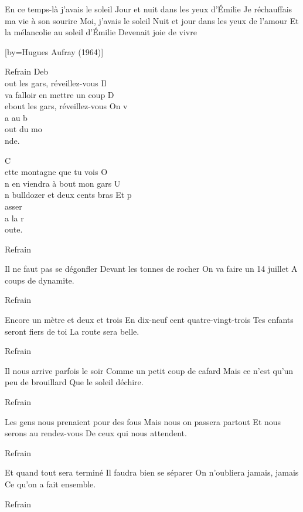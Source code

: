 \beginverse
En ce temps-là j'avais le soleil
Jour et nuit dans les yeux d'Émilie
Je réchauffais ma vie à son sourire
Moi, j'avais le soleil
Nuit et jour dans les yeux de l'amour
Et la mélancolie au soleil d'Émilie
Devenait joie de vivre
\endverse

[by={Hugues Aufray (1964)}]

\beginverse
Refrain
Deb\\[Lam]out les gars, réveillez-vous
Il\\[Sol] va falloir en mettre un coup
D\\[Lam]ebout les gars, réveillez-vous
On v\\[Do]a au b\\[Sol]out du mo\\[Lam]nde.
\endverse

\beginverse
C\\[Lam]ette montagne que tu vois
O\\[Sol]n en viendra à bout mon gars
U\\[Lam]n bulldozer et deux cents bras
Et p\\[Do]asser\\[Sol]a la r\\[Lam]oute.
\endverse

\beginverse
Refrain
\endverse

\beginverse
Il ne faut pas se dégonfler
Devant les tonnes de rocher
On va faire un 14 juillet
A coups de dynamite.
\endverse

\beginverse
Refrain
\endverse

\beginverse
Encore un mètre et deux et trois
En dix-neuf cent quatre-vingt-trois
Tes enfants seront fiers de toi
La route sera belle.
\endverse

\beginverse
Refrain
\endverse

\beginverse
Il nous arrive parfois le soir
Comme un petit coup de cafard
Mais ce n'est qu'un peu de brouillard
Que le soleil déchire.
\endverse

\beginverse
Refrain
\endverse

\beginverse
Les gens nous prenaient pour des fous
Mais nous on passera partout
Et nous serons au rendez-vous
De ceux qui nous attendent.
\endverse

\beginverse
Refrain
\endverse

\beginverse
Et quand tout sera terminé
Il faudra bien se séparer
On n'oubliera jamais, jamais
Ce qu'on a fait ensemble.
\endverse

\beginverse
Refrain\\[bis]
\endverse


